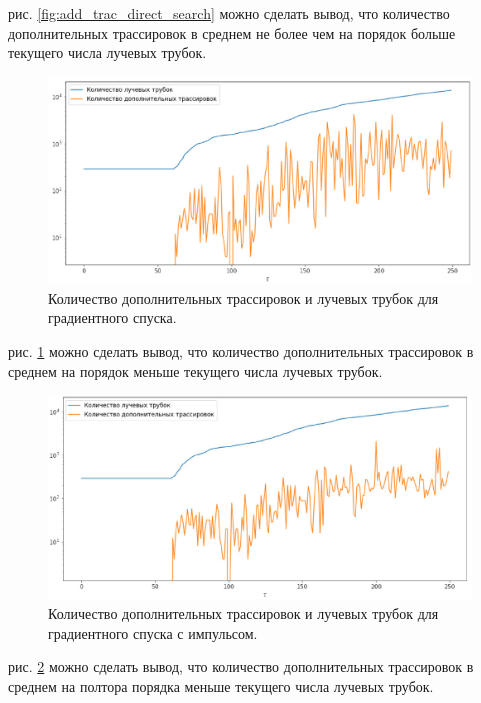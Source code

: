 \documentclass[12pt, cleqn, a4paper]{article}
\begin{document}
 рис. \ref{fig:add_trac_direct_search} можно сделать вывод, что количество дополнительных трассировок в среднем не более чем на порядок больше текущего числа лучевых трубок.

\begin{figure}[H] 
\centering
\includegraphics[width=1.0\linewidth]{add_trac_grad_step.eps}
\caption{Количество дополнительных трассировок и лучевых трубок для градиентного спуска.} 
\label{fig:add_trac_grad_step}
\end{figure}

 рис. \ref{fig:add_trac_grad_step} можно сделать вывод, что количество дополнительных трассировок в среднем на порядок меньше текущего числа лучевых трубок.

\begin{figure}[H] 
\centering
\includegraphics[width=1.0\linewidth]{add_trac_grad_impulse.eps}
\caption{Количество дополнительных трассировок и лучевых трубок для градиентного спуска с импульсом.}
\label{fig:add_trac_grad_impulse}
\end{figure}

 рис. \ref{fig:add_trac_grad_impulse} можно сделать вывод, что количество дополнительных трассировок в среднем на полтора порядка меньше текущего числа лучевых трубок.
\end{document}
